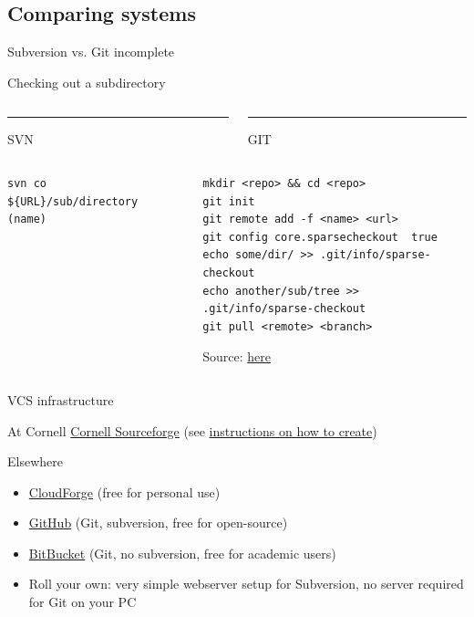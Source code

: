 \documentclass[xcolor=table,compress]{beamer}
\begin{document}
\subsection{Comparing systems}
\begin{frame}[fragile]{Subversion vs. Git}
\small
incomplete
\begin{block}{Checking out a subdirectory}
\begin{columns}
\begin{column}{.48\textwidth}
\color{red}\rule{\linewidth}{4pt}

SVN
\end{column}%
\hfill%
\begin{column}{.48\textwidth}
\color{blue}\rule{\linewidth}{4pt}

GIT
\end{column}%
\end{columns}
\begin{columns}
\begin{column}{.48\textwidth}
\color{red}
\begin{lstlisting}
svn co ${URL}/sub/directory (name)
\end{lstlisting}
\end{column}%
\hfill%
\begin{column}{.48\textwidth}
\color{blue}\tiny
\begin{lstlisting}
mkdir <repo> && cd <repo>
git init
git remote add -f <name> <url>
git config core.sparsecheckout  true
echo some/dir/ >> .git/info/sparse-checkout
echo another/sub/tree >>  .git/info/sparse-checkout
git pull <remote> <branch>
\end{lstlisting}
{\tiny Source: \href{http://jasonkarns.com/blog/subdirectory-checkouts-with-git-sparse-checkout/}{here}}
\end{column}%

\end{columns}
\end{block}
\end{frame}


\begin{frame}{VCS infrastructure}
\begin{block}{At Cornell}
\href{https://forge.cornell.edu/sf/sfmain/do/home}{Cornell Sourceforge} (see \href{http://www.it.cornell.edu/services/subversion/howto/create.cfm}{instructions on how to create})
\end{block}
\begin{block}{Elsewhere}
\begin{itemize}
\item \href{http://app.cloudforge.com}{CloudForge} (free for personal use)
\item \href{https://github.com/plans}{GitHub} (Git, subversion, free for open-source)
\item \href{http://bitbucket.org/}{BitBucket} (Git, no subversion, free for academic users)
\item Roll your own: very simple webserver setup for Subversion, no server required for Git on your PC
\end{itemize}
\end{block}
\end{frame}
\end{document}

